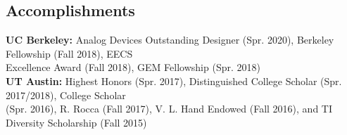\documentclass[letter]{res}
\begin{document}
\begin{resume}
\vspace{-8mm}

\section{Accomplishments}

\textbf{UC Berkeley:} Analog Devices Outstanding Designer (Spr. 2020), Berkeley Fellowship (Fall 2018), EECS \\
Excellence Award (Fall 2018), GEM Fellowship (Spr. 2018) \\
\textbf{UT Austin:} Highest Honors (Spr. 2017), Distinguished College Scholar (Spr. 2017/2018), College Scholar \\
(Spr. 2016), R. Rocca (Fall 2017), V. L. Hand Endowed (Fall 2016), and TI Diversity Scholarship (Fall 2015)

\end{resume}
\end{document}
